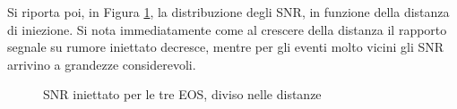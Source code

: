 Si riporta poi, in Figura \ref{fig:SNR_INJ_REC_COUNTS}, la distribuzione degli SNR, in funzione della distanza di iniezione. Si nota immediatamente come al crescere della distanza il rapporto segnale su rumore iniettato decresce, mentre per gli eventi molto vicini gli SNR arrivino a grandezze considerevoli. \\
\begin{figure}[ht]
	\vspace{-30pt}
	\centering
	\vspace{-8pt}
	\caption{SNR iniettato per le tre EOS, diviso nelle distanze}
	\label{fig:SNR_INJ_REC_COUNTS}
	\vspace{-15pt}
\end{figure}

